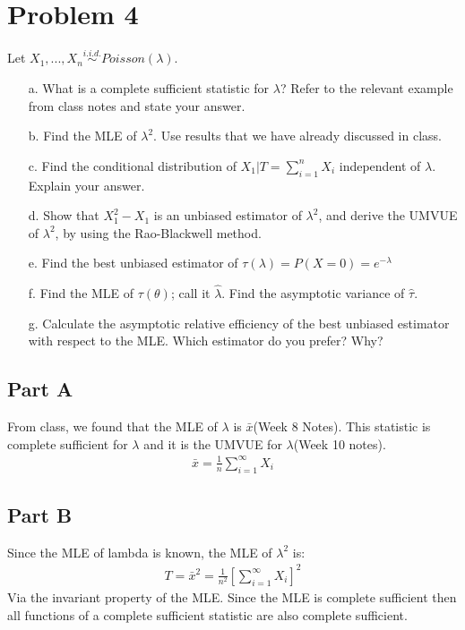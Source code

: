 \documentclass{article}
\begin{document}
\section*{Problem 4}
Let $X_1,...,X_n \overset{i.i.d.}{\sim} Poisson(\lambda)$.
\begin{enumerate}
\item[a.] What is a complete sufficient statistic for $\lambda$? Refer to the relevant example from class notes and state your answer.
\item[b.] Find the MLE of $\lambda^2$. Use results that we have already discussed in class.
\item[c.] Find the conditional distribution of $X_1|T=\sum_{i=1}^{n}X_i$ independent of $\lambda$. Explain your answer.
\item[d.] Show that $X^2_1-X_1$ is an unbiased estimator of $\lambda^2$, and derive the UMVUE of $\lambda^2$, by using the Rao-Blackwell method.
\item[e.] Find the best unbiased estimator of $\tau(\lambda) = P(X=0)= e^{-\lambda}$
\item[f.] Find the MLE of $\tau(\theta)$; call it $\hat{\lambda}$. Find the asymptotic variance of $\hat{\tau}$.
\item[g.] Calculate the asymptotic relative efficiency of the best unbiased estimator with respect to the MLE. Which estimator do you prefer? Why?
\end{enumerate}
\subsection*{Part A}
From class, we found that the MLE of $\lambda$ is $\bar{x}$(Week 8 Notes). This statistic is complete sufficient for $\lambda$ and it is the UMVUE for $\lambda$(Week 10 notes).
\begin{align*}
\boxed{ \bar{x} = \frac{1}{n} \sum_{i=1}^{\infty} X_i  }
\end{align*}

\subsection*{Part B}
Since the MLE of lambda is known, the MLE of $\lambda^2$ is:
\begin{align*}
\boxed{ T = \bar{x}^2 = \frac{1}{n^2} [\sum_{i=1}^{\infty} X_i]^2  }
\end{align*}
Via the invariant property of the MLE. Since the MLE is complete sufficient then all functions of a complete sufficient statistic are also complete sufficient.
\end{document}

